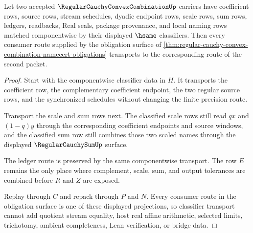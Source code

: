\begin{theorem}
\label{thm:regular-cauchy-convex-combination-bound-preservation}
Let two accepted $\RegularCauchyConvexCombinationUp$ carriers have coefficient rows, source rows, stream schedules, dyadic endpoint rows, scale rows, sum rows, ledgers, readbacks, Real seals, package provenance, and local naming rows matched componentwise by their displayed $\hsame$ classifiers. Then every consumer route supplied by the obligation surface of \autoref{thm:regular-cauchy-convex-combination-namecert-obligations} transports to the corresponding route of the second packet.
\end{theorem}
\begin{proof}
Start with the componentwise classifier data in $H$. It transports the coefficient row, the complementary coefficient endpoint, the two regular source rows, and the synchronized schedules without changing the finite precision route.

Transport the scale and sum rows next. The classified scale rows still read $q x$ and $(1-q)y$ through the corresponding coefficient endpoints and source windows, and the classified sum row still combines those two scaled names through the displayed $\RegularCauchySumUp$ surface.

The ledger route is preserved by the same componentwise transport. The row $E$ remains the only place where complement, scale, sum, and output tolerances are combined before $R$ and $Z$ are exposed.

Replay through $C$ and repack through $P$ and $N$. Every consumer route in the obligation surface is one of these displayed projections, so classifier transport cannot add quotient stream equality, host real affine arithmetic, selected limits, trichotomy, ambient completeness, Lean verification, or bridge data.
\end{proof}


